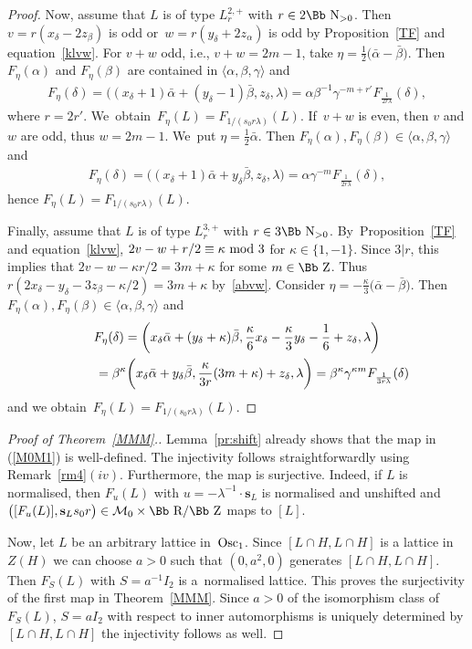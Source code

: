 \documentclass[pdftex]{sigma}
\newcommand\RR{{\mbox{\Bb R}}}
\newcommand\NN{{\mbox{\Bb N}}}
\newcommand\ZZ{{\mbox{\Bb Z}}}
\newcommand\cM{{\mathcal M}}
\newcommand{\Osc}{{\rm Osc}}
\newcommand\la{\langle}
\newcommand\ra{\rangle}
\numberwithin{equation}{section}
\begin{document}
\begin{proof}
Now, assume that $L$ is of type $L^{2,+}_{r}$ with $r\in 2\NN_{>0}$.
Then $v=r(x_\delta-2z_\beta)$ is odd or~$w=r(y_\delta+2z_\alpha)$ is odd by Proposition~\ref{TF} and equation~\eqref{klvw}.
For $v+w$ odd, i.e., $v+w=2m-1$, take $\eta=\frac{1}{2}\big(\bar\alpha-\bar\beta\big)$.
Then $F_\eta(\alpha)$ and $F_\eta(\beta)$ are contained in $\la \alpha,\beta,\gamma\ra$ and
\begin{gather*}
F_\eta(\delta)=\big((x_\delta+1)\bar\alpha+(y_\delta-1)\bar\beta, z_\delta,\lambda\big)=\alpha\beta^{-1}\gamma^{-m+r'}F_{\frac1{2r\lambda}}(\delta),
\end{gather*}
where $r=2r'$. We~obtain~$F_\eta(L)=F_{1/(s_0r\lambda)}(L)$. If~$v+w$ is even, then $v$ and $w$ are odd, thus $w=2m-1$. We~put $\eta=\frac{1}{2}\bar\alpha$. Then $F_\eta(\alpha), F_\eta(\beta) \in\la \alpha,\beta,\gamma\ra$ and
\begin{gather*}
F_\eta(\delta)=\big((x_\delta+1)\bar\alpha+y_\delta\bar\beta, z_\delta,\lambda\big)=\alpha\gamma^{-m}F_{\frac1{2r\lambda}}(\delta),
\end{gather*}
hence $F_\eta(L)=F_{1/(s_0r\lambda)}(L)$.

Finally, assume that $L$ is of type $L^{3,+}_{r}$ with $r\in 3\NN_{>0}$. By~Proposition~\ref{TF} and equation~\eqref{klvw}, $2v-w+r/2\equiv \kappa\ {\rm mod}\ 3$ for $\kappa\in\{1,-1\}$. Since $3|r$, this implies that $2v-w-\kappa r/2=3m+\kappa$ for some $m\in\ZZ$.
Thus $r(2x_\delta-y_\delta -3z_\beta-\kappa/2)=3m+\kappa$ by~\eqref{abvw}.
Consider $\eta=-\frac{\kappa}{3}\big(\bar\alpha-\bar\beta\big)$.
Then $F_\eta(\alpha), F_\eta(\beta) \in\la \alpha,\beta,\gamma\ra$ and
\begin{gather*}
F_\eta(\delta)=\bigg(x_\delta\bar\alpha+(y_\delta+\kappa)\bar\beta, \frac\kappa6 x_\delta-\frac\kappa3 y_\delta-\frac16+z_\delta ,\lambda\bigg)
\\ \hphantom{F_\eta(\delta)}
{}= \beta^\kappa \bigg(x_\delta\bar\alpha+y_\delta\bar\beta, \frac\kappa{3r}(3m+\kappa)+z_\delta ,\lambda\bigg)
= \beta^\kappa\gamma^{\kappa m}F_{\frac 1{3r\lambda}}(\delta)
\end{gather*}
and we obtain~$F_\eta(L)=F_{1/(s_0r\lambda)}(L)$.
\end{proof}

\begin{proof}[Proof of Theorem~\ref{MMM}.]
Lemma~\ref{pr:shift} already shows that the map in (\ref{M0M1}) is well-defined. The injectivity follows straightforwardly using Remark~\ref{rm4}$(iv)$. Furthermore, the map is surjective. Indeed, if $L$ is normalised, then $F_u(L)$ with $u=-\lambda^{-1}\cdot\textbf{s}_L$ is normalised and unshifted and $\big([F_u(L)],\textbf{s}_L s_0 r\big)\in\cM_0\times\RR/\ZZ$ maps to $[L]$.

Now, let $L$ be an arbitrary lattice in~$\Osc_1$.
Since $[L\cap H,L\cap H]$ is a lattice in~$Z(H)$ we can choose $a>0$ such that $(0,a^2,0)$ generates $[L\cap H,L\cap H]$.
Then $F_S(L)$ with $S={a}^{-1}I_2$ is a~normalised lattice. This proves the surjectivity of the first map in Theorem~\ref{MMM}. Since $a>0$ of the isomorphism class of~$F_S(L)$, $S=aI_2$ with respect to inner automorphisms is uniquely determined by $[L\cap H,L\cap H]$ the injectivity follows as well.
\end{proof}
\end{document}
